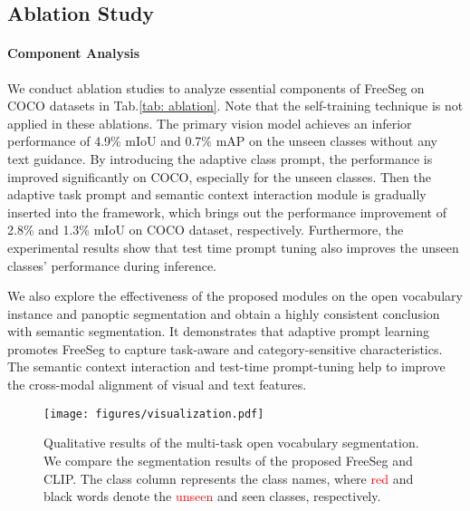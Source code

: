 \documentclass[10pt,twocolumn,letterpaper]{article}
\begin{document}
\subsection{Ablation Study}

\paragraph{Component Analysis}

We conduct ablation studies to analyze essential components of FreeSeg on COCO datasets in Tab.\ref{tab: ablation}. Note that the self-training technique is not applied in these ablations.
The primary vision model achieves an inferior performance of 4.9\% mIoU and 0.7\% mAP on the unseen classes without any text guidance. 
By introducing the adaptive class prompt, the performance is improved significantly on COCO, especially for the unseen classes.
Then the adaptive task prompt and semantic context interaction module is gradually inserted into the framework, which brings out the performance improvement of 2.8\% and 1.3\% mIoU on COCO dataset, respectively. 
Furthermore, the experimental results show that test time prompt tuning also improves the unseen classes' performance during inference. 


We also explore the effectiveness of the proposed modules on the open vocabulary instance and panoptic segmentation and obtain a highly consistent conclusion with semantic segmentation.
It demonstrates that adaptive prompt learning promotes FreeSeg to capture task-aware and category-sensitive characteristics. 
The semantic context interaction and test-time prompt-tuning help to improve the cross-modal alignment of visual and text features.

\begin{figure*}[tp]
    \centering
    \begin{center}
        \texttt{[image: figures/visualization.pdf]}
    \end{center}
        \vspace{-20pt}
    \caption{Qualitative results of the multi-task open vocabulary segmentation. We compare the segmentation results of the proposed FreeSeg and CLIP\cite{radford2021learning}. The class column represents the class names, where \textcolor{red}{red} and black words denote the \textcolor{red}{unseen} and seen classes, respectively. }
    \label{fig: visualization}
    \vspace{-5pt}
    \end{figure*}
\end{document}
